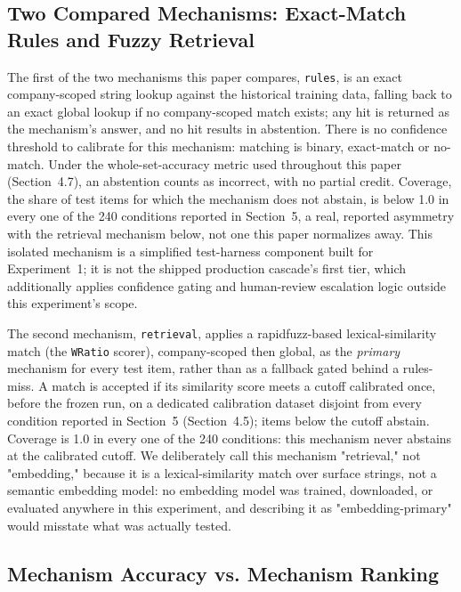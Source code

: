 \documentclass[11pt]{article}
\begin{document}
\subsection{Two Compared Mechanisms: Exact-Match Rules and Fuzzy Retrieval}
\label{sec:mechanisms}

The first of the two mechanisms this paper compares, \texttt{rules}, is an
exact company-scoped string lookup against the historical training data,
falling back to an exact global lookup if no company-scoped match exists; any
hit is returned as the mechanism's answer, and no hit results in abstention.
There is no confidence threshold to calibrate for this mechanism: matching
is binary, exact-match or no-match. Under the whole-set-accuracy metric used
throughout this paper (Section~4.7), an abstention counts as incorrect, with
no partial credit. Coverage, the share of test items for which the
mechanism does not abstain, is below 1.0 in every one of the 240 conditions
reported in Section~5, a real, reported asymmetry with the retrieval
mechanism below, not one this paper normalizes away. This isolated mechanism
is a simplified test-harness component built for Experiment~1; it is not the
shipped production cascade's first tier, which additionally applies
confidence gating and human-review escalation logic outside this
experiment's scope.

The second mechanism, \texttt{retrieval}, applies a rapidfuzz-based
lexical-similarity match (the \texttt{WRatio} scorer), company-scoped then
global, as the \emph{primary} mechanism for every test item, rather than as a
fallback gated behind a rules-miss. A match is accepted if its similarity
score meets a cutoff calibrated once, before the frozen run, on a dedicated
calibration dataset disjoint from every condition reported in Section~5
(Section~4.5); items below the cutoff abstain. Coverage is 1.0 in every one
of the 240 conditions: this mechanism never abstains at the calibrated
cutoff. We deliberately call this mechanism "retrieval," not "embedding,"
because it is a lexical-similarity match over surface strings, not a
semantic embedding model: no embedding model was trained, downloaded, or
evaluated anywhere in this experiment, and describing it as
"embedding-primary" would misstate what was actually tested.

\subsection{Mechanism Accuracy vs. Mechanism Ranking}
\label{sec:accuracy-vs-ranking}
\end{document}
